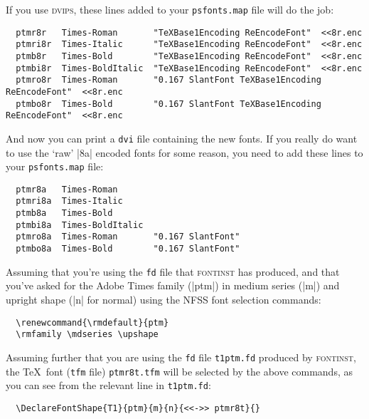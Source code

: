\documentclass[a4paper]{ltxguide}
\newcommand*{\setfilename}[1]{\texttt{#1}}
\newcommand*{\setpackagename}[1]{\textsc{#1}}
\newcommand{\dvips}   {\setpackagename{dvips}\xspace}
\newcommand{\fontinst}{\setpackagename{font\-inst}\xspace}
\newcommand{\fd} {\setfilename{fd}\xspace}
\newcommand{\tfm}{\setfilename{tfm}\xspace}
\newcommand{\dvi}{\setfilename{dvi}\xspace}
\begin{document}
If you use \dvips, these lines added to your \texttt{psfonts.map}
file will do the job:
\begin{verbatim}
  ptmr8r   Times-Roman       "TeXBase1Encoding ReEncodeFont"  <<8r.enc
  ptmri8r  Times-Italic      "TeXBase1Encoding ReEncodeFont"  <<8r.enc
  ptmb8r   Times-Bold        "TeXBase1Encoding ReEncodeFont"  <<8r.enc
  ptmbi8r  Times-BoldItalic  "TeXBase1Encoding ReEncodeFont"  <<8r.enc
  ptmro8r  Times-Roman       "0.167 SlantFont TeXBase1Encoding ReEncodeFont"  <<8r.enc
  ptmbo8r  Times-Bold        "0.167 SlantFont TeXBase1Encoding ReEncodeFont"  <<8r.enc
\end{verbatim}
And now you can print a \dvi file containing the new fonts.  If
you really do want to use the `raw' |8a| encoded fonts for some
reason, you need to add these lines to your \texttt{psfonts.map}
file:
\begin{verbatim}
  ptmr8a   Times-Roman
  ptmri8a  Times-Italic
  ptmb8a   Times-Bold
  ptmbi8a  Times-BoldItalic
  ptmro8a  Times-Roman       "0.167 SlantFont"
  ptmbo8a  Times-Bold        "0.167 SlantFont"
\end{verbatim}

Assuming that you're using the \fd file that \fontinst has
produced, and that you've asked for the Adobe Times family (|ptm|)
in medium series (|m|) and upright shape (|n| for normal) using
the NFSS font selection commands:
\begin{verbatim}
  \renewcommand{\rmdefault}{ptm}
  \rmfamily \mdseries \upshape
\end{verbatim}
Assuming further that you are using the \fd file \texttt{t1ptm.fd}
produced by \fontinst, the \TeX\ font (\tfm file) \texttt{ptmr8t.tfm}
will be selected by the above commands, as you can see from the
relevant line in \texttt{t1ptm.fd}:
\begin{verbatim}
  \DeclareFontShape{T1}{ptm}{m}{n}{<<->> ptmr8t}{}
\end{verbatim}
\end{document}
